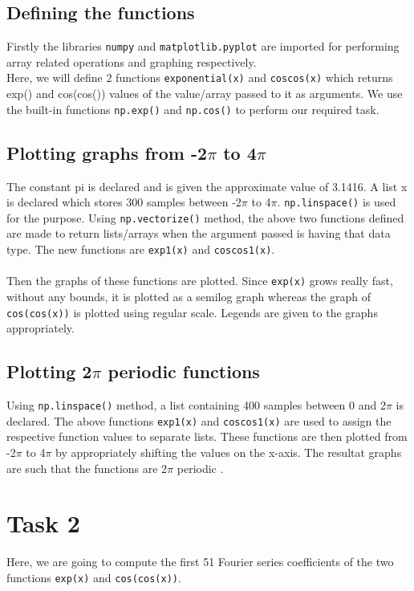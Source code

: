 \documentclass[11pt, a4paper]{article}
\begin{document}
\subsection{Defining the functions}
Firstly the libraries \texttt{numpy} and \texttt{matplotlib.pyplot} are imported for performing array related operations and graphing respectively.\\
Here, we will define 2 functions \texttt{exponential(x)} and \texttt{coscos(x)} which returns exp() and cos(cos()) values of the value/array passed to it as arguments. We use the built-in functions \texttt{np.exp()} and \texttt{np.cos()} to perform our required task.

\subsection{Plotting graphs from -2$\pi$ to 4$\pi$} 
The constant pi is declared and is given the approximate value of 3.1416. A list x is declared which stores 300 samples between -2$\pi$ to 4$\pi$. \texttt{np.linspace()} is used for the purpose. Using \texttt{np.vectorize()} method, the above two functions defined are made to return lists/arrays when the argument passed is having that data type. The new functions are \texttt{exp1(x)} and \texttt{coscos1(x)}. \\ \\
Then the graphs of these functions are plotted. Since \texttt{exp(x)} grows really fast, without any bounds, it is plotted as a semilog graph whereas the graph of \texttt{cos(cos(x))} is plotted using regular scale. Legends are given to the graphs appropriately.

\subsection{Plotting 2$\pi$ periodic functions}
Using \texttt{np.linspace()} method, a list containing 400 samples between 0 and  2$\pi$ is declared. The above functions \texttt{exp1(x)} and \texttt{coscos1(x)} are used to assign the respective function values to separate lists. These functions are then plotted from  -2$\pi$ to 4$\pi$ by appropriately shifting the values on the x-axis. The resultat graphs are such that the functions are 2$\pi$ periodic . 

\section{Task 2}
Here, we are going to compute the first 51 Fourier series coefficients of the two functions \texttt{exp(x)} and \texttt{cos(cos(x))}.
\end{document}
